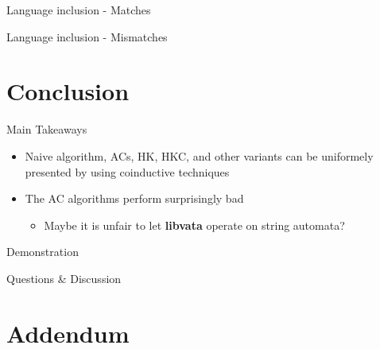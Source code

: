 \documentclass[compress]{beamer}
\begin{document}
\begin{frame}{Language inclusion - Matches}
  \begin{figure}

    

  \end{figure}
\end{frame}

\begin{frame}{Language inclusion - Mismatches}
  \begin{figure}

    \hspace*{0.95cm}
    

  \end{figure}
\end{frame}

\section{Conclusion}

\begin{frame}{Main Takeaways}
  \begin{itemize}
    \item<1-> Naive algorithm, ACs, HK, HKC, and other variants can be uniformely
      presented by using coinductive techniques
    \item<2-> The AC algorithms perform surprisingly bad
      \begin{itemize}
        \item Maybe it is unfair to let \textbf{libvata} operate on string automata?
      \end{itemize}
  \end{itemize}
\end{frame}

\begin{frame}{Demonstration}
  \begin{center}
    \href{https://perso.ens-lyon.fr/damien.pous/hknt/}{}
  \end{center}
\end{frame}

\begin{frame}
  \begin{center}
    \huge{Questions \& Discussion}
  \end{center}
\end{frame}

\section*{Addendum}
\end{document}
